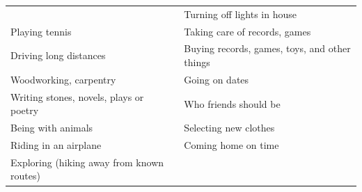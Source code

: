 \documentclass[]{book}
\begin{document}
\begin{longtable}[]{@{}ll@{}}
\begin{minipage}[t]{0.50\columnwidth}
\end{minipage} & \begin{minipage}[t]{0.44\columnwidth}\raggedright
Turning off lights in house\strut
\end{minipage}\tabularnewline
\begin{minipage}[t]{0.50\columnwidth}\raggedright
Playing tennis\strut
\end{minipage} & \begin{minipage}[t]{0.44\columnwidth}\raggedright
Taking care of records, games\strut
\end{minipage}\tabularnewline
\begin{minipage}[t]{0.50\columnwidth}\raggedright
Driving long distances\strut
\end{minipage} & \begin{minipage}[t]{0.44\columnwidth}\raggedright
Buying records, games, toys, and other things\strut
\end{minipage}\tabularnewline
\begin{minipage}[t]{0.50\columnwidth}\raggedright
Woodworking, carpentry\strut
\end{minipage} & \begin{minipage}[t]{0.44\columnwidth}\raggedright
Going on dates\strut
\end{minipage}\tabularnewline
\begin{minipage}[t]{0.50\columnwidth}\raggedright
Writing stones, novels, plays or poetry\strut
\end{minipage} & \begin{minipage}[t]{0.44\columnwidth}\raggedright
Who friends should be\strut
\end{minipage}\tabularnewline
\begin{minipage}[t]{0.50\columnwidth}\raggedright
Being with animals\strut
\end{minipage} & \begin{minipage}[t]{0.44\columnwidth}\raggedright
Selecting new clothes\strut
\end{minipage}\tabularnewline
\begin{minipage}[t]{0.50\columnwidth}\raggedright
Riding in an airplane\strut
\end{minipage} & \begin{minipage}[t]{0.44\columnwidth}\raggedright
Coming home on time\strut
\end{minipage}\tabularnewline
\begin{minipage}[t]{0.50\columnwidth}\raggedright
Exploring (hiking away from known routes)\strut

\end{minipage}
\end{longtable}
\end{document}
